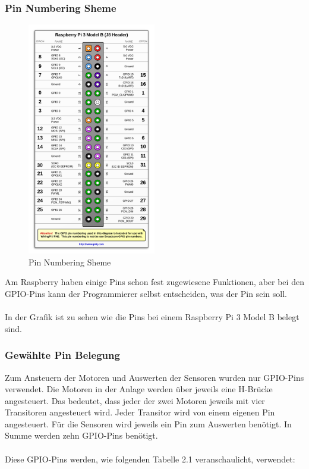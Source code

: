 \newpage

\subsubsection{Pin Numbering Sheme}

\begin{figure}
\vspace{-40pt}
  \begin{center}
    \includegraphics[width=0.50\textwidth]{Bilder/pi4j/PinNumberingSheme}
  \end{center}
  \caption{Pin Numbering Sheme}
  \label{Magazin Vorne}
  \vspace{-320pt}
\end{figure}

Am Raspberry haben einige Pins schon fest zugewiesene Funktionen, aber bei den GPIO-Pins kann der Programmierer selbst entscheiden, was der Pin sein soll.
\\ \\
In der Grafik ist zu sehen wie die Pins bei einem Raspberry Pi 3 Model B belegt sind.

\vspace{300pt}

\subsubsection{Gewählte Pin Belegung}
Zum Ansteuern der Motoren und Auswerten der Sensoren wurden nur GPIO-Pins verwendet. Die Motoren in der Anlage werden über jeweils eine H-Brücke angesteuert. Das bedeutet, dass jeder der zwei Motoren jeweils mit vier Transitoren angesteuert wird. Jeder Transitor wird von einem eigenen Pin angesteuert. Für die Sensoren wird jeweils ein Pin zum Auswerten benötigt. In Summe werden zehn GPIO-Pins benötigt. \\ \\ Diese GPIO-Pins werden, wie folgenden Tabelle 2.1 veranschaulicht, verwendet:

